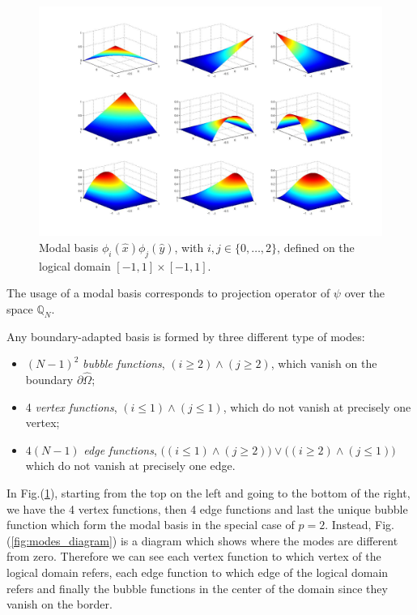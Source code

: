 \begin{figure}
\centering
\includegraphics[scale=0.25]{images/2D_basis.jpg}
\caption{Modal basis $\phi_i(\hat{x})\phi_j(\hat{y})$, with $i,j\in\{0,\dots,2\}$, defined on the logical domain $[-1,1]\times[-1,1]$.}\label{fig:2D_basis}
\end{figure}

The usage of a modal basis corresponds to projection operator of $\psi$ over the space $\mathbb{Q}_N$.
\medskip

Any boundary-adapted basis is formed by three different type of modes:
\begin{itemize}
  \item $(N-1)^2$ \textit{bubble functions}, $(i\geq 2)\wedge(j\geq 2)$, which vanish on the boundary $\partial\hat{\Omega}$;
  \item 4 \textit{vertex functions}, $(i\leq 1)\wedge(j\leq 1)$, which do not vanish at precisely one vertex;
  \item $4(N-1)$ \textit{edge functions}, $\big((i\leq 1)\wedge(j\geq 2)\big)\vee\big((i\geq 2)\wedge(j\leq 1)\big)$ which do not vanish at precisely one edge.
\end{itemize}

In Fig.(\ref{fig:2D_basis}), starting from the top on the left and going to the bottom of the right, we have the 4 vertex functions, then 4 edge functions and last the unique bubble function which form the modal basis in the special case of $p=2$. Instead, Fig.(\ref{fig:modes_diagram}) is a diagram which shows where the modes are different from zero. Therefore we can see each vertex function to which vertex of the logical domain refers, each edge function to which edge of the logical domain refers and finally the bubble functions in the center of the domain since they vanish on the border.

